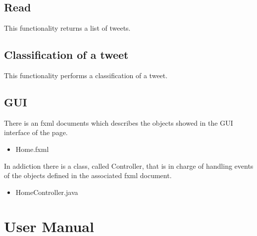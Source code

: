 \documentclass[a4paper, oneside]{article}
\begin{document}
\subsection{Read}
This functionality returns a list of tweets.
\vspace{2mm}
\\<code here>
\vspace{5mm}

\subsection{Classification of a tweet}
This functionality performs a classification of a tweet.
\vspace{2mm}
\\<code here>
\vspace{5mm}

\clearpage

\subsection{GUI}
There is an fxml documents which describes the objects showed in the GUI interface of the  page.
\begin{itemize}
\item Home.fxml
\end{itemize}
In addiction there is a class, called Controller, that is in charge of handling events of the objects defined in the associated fxml document.
\begin{itemize}
\item HomeController.java
\end{itemize}

\clearpage
\section{User Manual}
\end{document}
